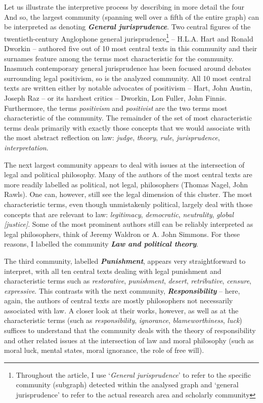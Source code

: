\documentclass[
]{article}
\begin{document}
Let us illustrate the interpretive process by describing in more detail the four And so, the largest community (spanning well over a fifth of the entire graph) can be interpreted as denoting \textbf{\emph{General jurisprudence}}. Two central figures of the twentieth-century Anglophone general jurisprudence\footnote{Throughout the article, I use `\emph{General jurisprudence}' to refer to the specific community (subgraph) detected within the analysed graph and `general jurisprudence' to refer to the actual research area and scholarly community} -- H.L.A. Hart and Ronald Dworkin -- authored five out of 10 most central texts in this community and their surnames feature among the terms most characteristic for the community. Inasmuch contemporary general jurisprudence has been focused around debates surrounding legal positivism, so is the analyzed community. All 10 most central texts are written either by notable advocates of positivism -- Hart, John Austin, Joseph Raz -- or its harshest critics -- Dworkin, Lon Fuller, John Finnis. Furthermore, the terms \emph{positivism} and \emph{positivist} are the two terms most characteristic of the community. The remainder of the set of most characteristic terms deals primarily with exactly those concepts that we would associate with the most abstract reflection on law: \emph{judge}, \emph{theory}, \emph{rule}, \emph{jurisprudence}, \emph{interpretation}.

The next largest community appears to deal with issues at the intersection of legal and political philosophy. Many of the authors of the most central texts are more readily labelled as political, not legal, philosophers (Thomas Nagel, John Rawls). One can, however, still see the legal dimension of this cluster. The most characteristic terms, even though unmistakenly political, largely deal with those concepts that are relevant to law: \emph{legitimacy}, \emph{democratic}, \emph{neutrality}, \emph{global {[}justice{]}}. Some of the most prominent authors still can be reliably interpreted as legal philosophers, think of Jeremy Waldron or A. John Simmons. For these reasons, I labelled the community \textbf{\emph{Law and political theory}}.

The third community, labelled \textbf{\emph{Punishment}}, appears very straightforward to interpret, with all ten central texts dealing with legal punishment and characteristic terms such as \emph{restorative}, \emph{punishment}, \emph{desert}, \emph{retributive}, \emph{censure}, \emph{expressive}. This contrasts with the next community, \textbf{\emph{Responsibility}} -- here, again, the authors of central texts are mostly philosophers not necessarily associated with law. A closer look at their works, however, as well as at the characteristic terms (such as \emph{responsibility}, \emph{ignorance}, \emph{blameworthiness}, \emph{luck}) suffices to understand that the community deals with the theory of responsibility and other related issues at the intersection of law and moral philosophy (such as moral luck, mental states, moral ignorance, the role of free will).
\end{document}
